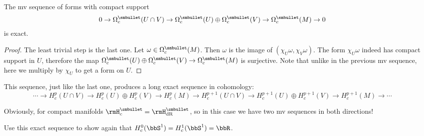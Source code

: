 \begin{prop}
    The \gls{mv} sequence of forms with compact support
    \[0\to \Omega_c^{\smbullet }(U\cap V)\to \Omega_c^{\smbullet }(U)\oplus\Omega_c^{\smbullet }(V)\to \Omega_c^{\smbullet }(M)\to 0\]
    is exact.
\end{prop}
\begin{proof}
    The least trivial step is the last one. Let $\omega\in\Omega_c^{\smbullet }(M)$. Then $\omega$ is the image of $(\chi_U\omega,\chi_V\omega)$. The form $\chi_U\omega$ indeed has compact support in $U$, therefore the map $\Omega_c^{\smbullet }(U)\oplus\Omega_c^{\smbullet }(V)\to \Omega_c^{\smbullet }(M)$ is surjective. Note that unlike in the previous \gls{mv} sequence, here we multiply by $\chi_U$ to get a form on $U$.
\end{proof}

This sequence, just like the last one, produces a long exact sequence in cohomology:
\[
\scriptstyle
\cdots\to H_c^p(U\cap V)\to H_c^p(U)\oplus H_c^p(V)\to H_c^p(M)\to H_c^{p+1}(U\cap V)\to H_c^{p+1}(U)\oplus H_c^{p+1}(V)\to H_c^{p+1}(M)\to \cdots
\]

Obviously, for compact manifolds $\rmH^{\smbullet }_c=\rmH^{\smbullet }_{\rm dR}$, so in this case we have two \gls{mv} sequences in both directions!

\begin{xca}
    Use this exact sequence to show again that $H_c^0(\bbS^1)=H_c^1(\bbS^1)=\bbR$.
\end{xca}

